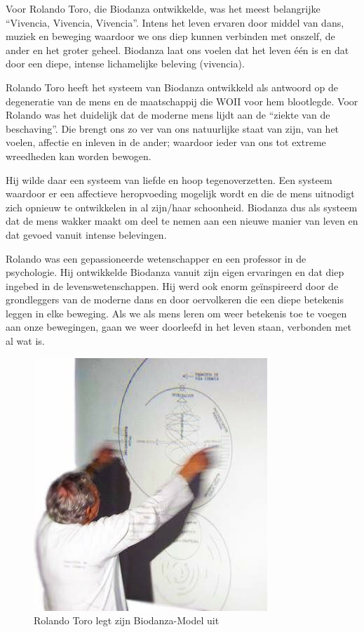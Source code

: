 \documentclass[
  11pt,
]{book}
\begin{document}
Voor Rolando Toro, die Biodanza ontwikkelde, was het meest belangrijke ``Vivencia, Vivencia, Vivencia''. Intens het leven ervaren door middel van dans, muziek en beweging waardoor we ons diep kunnen verbinden met onszelf, de ander en het groter geheel. Biodanza laat ons voelen dat het leven één is en dat door een diepe, intense lichamelijke beleving (vivencia).

Rolando Toro heeft het systeem van Biodanza ontwikkeld als antwoord op de degeneratie van de mens en de maatschappij die WOII voor hem blootlegde. Voor Rolando was het duidelijk dat de moderne mens lijdt aan de ``ziekte van de beschaving''. Die brengt ons zo ver van ons natuurlijke staat van zijn, van het voelen, affectie en inleven in de ander; waardoor ieder van ons tot extreme wreedheden kan worden bewogen.

Hij wilde daar een systeem van liefde en hoop tegenoverzetten. Een systeem waardoor er een affectieve heropvoeding mogelijk wordt en die de mens uitnodigt zich opnieuw te ontwikkelen in al zijn/haar schoonheid. Biodanza dus als systeem dat de mens wakker maakt om deel te nemen aan een nieuwe manier van leven en dat gevoed vanuit intense belevingen.

Rolando was een gepassioneerde wetenschapper en een professor in de psychologie. Hij ontwikkelde Biodanza vanuit zijn eigen ervaringen en dat diep ingebed in de levenswetenschappen. Hij werd ook enorm geïnspireerd door de grondleggers van de moderne dans en door oervolkeren die een diepe betekenis leggen in elke beweging. Als we als mens leren om weer betekenis toe te voegen aan onze bewegingen, gaan we weer doorleefd in het leven staan, verbonden met al wat is.

\begin{figure}

{\centering \includegraphics[width=0.45\linewidth]{./figs/rolandoAndModel} 

}

\caption{Rolando Toro legt zijn Biodanza-Model uit}\label{fig:rolandoModel}
\end{figure}
\end{document}
